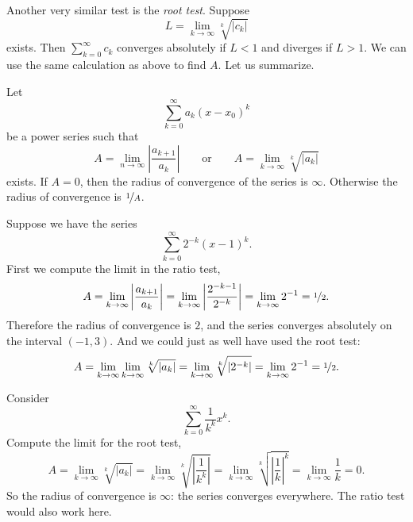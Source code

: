 Another very similar test is the \emph{root test}.
Suppose
\begin{equation*}
L = \lim_{k\to\infty} \sqrt[k]{\lvert c_k \rvert}
\end{equation*}
exists.  Then $\sum_{k=0}^\infty c_k$ converges absolutely if $L < 1$
and diverges if $L > 1$.  We can use the same calculation as above
to find $A$.
Let us summarize.

\begin{theorem}
Let
\begin{equation*}
\sum_{k=0}^\infty a_k {(x-x_0)}^k
\end{equation*}
be a power series such that
\begin{equation*}
A =
\lim_{n\to\infty}
\left \lvert
\frac{a_{k+1}}{a_k}
\right \rvert
\qquad \text{or} \qquad
A =
\lim_{k\to\infty} \sqrt[k]{\lvert a_k \rvert}
\end{equation*}
exists.  If $A = 0$, then the radius of convergence of the series
is $\infty$.  Otherwise the radius of convergence is $\nicefrac{1}{A}$.
\end{theorem}

\begin{example}
Suppose we have the series
\begin{equation*}
\sum_{k=0}^\infty 2^{-k} {(x-1)}^k .
\end{equation*}
First we compute the limit in the ratio test,
\begin{equation*}
A = \lim_{k\to\infty} 
\left \lvert
\frac{a_{k+1}}{a_k}
\right \rvert
=
\lim_{k\to\infty} 
\left \lvert
\frac{2^{-k-1}}{2^{-k}}
\right \rvert
=
\lim_{k\to\infty} 
2^{-1} = \nicefrac{1}{2}.
\end{equation*}
Therefore the radius of convergence is $2$, and the series
converges absolutely on the interval $(-1,3)$.
And we could just as well have used the root test:
\begin{equation*}
A = \lim_{k\to\infty} 
\lim_{k\to\infty} 
\sqrt[k]{\lvert
a_k
\rvert}
=
\lim_{k\to\infty} 
\sqrt[k]{\lvert
2^{-k}
\rvert}
=
\lim_{k\to\infty} 
2^{-1}
=
\nicefrac{1}{2}.
\end{equation*}
\end{example}

\begin{example}
Consider
\begin{equation*}
\sum_{k=0}^\infty \frac{1}{k^k} {x}^k .
\end{equation*}
Compute the limit for the root test,
\begin{equation*}
A =
\lim_{k\to\infty} 
\sqrt[k]{\lvert a_k \rvert}
=
\lim_{k\to\infty} 
\sqrt[k]{
\left\lvert\frac{1}{k^k}\right\rvert}
=
\lim_{k\to\infty} 
\sqrt[k]{
{\left\lvert\frac{1}{k}\right\rvert}^{k}}
=
\lim_{k\to\infty} 
\frac{1}{k}
=
0 .
\end{equation*}
So the radius of convergence is $\infty$: the series
converges everywhere.  The ratio test would also work here.
\end{example}

